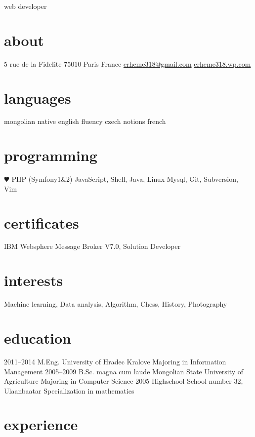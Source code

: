 \documentclass[backend=biber, print]{friggeri-cv}
\begin{document}
       {web developer}


\begin{aside}
  \section{about}
    5 rue de la Fidelite
    75010 Paris
    France
    \href{mailto:erheme318@gmail.com}{erheme318@gmail.com}
    \href{http://erheme318.wordpress.com}{erheme318.wp.com}
    \href{http://github.com/erheme318}{}
  \section{languages}
    mongolian native
    english fluency
    czech notions
    french
  \section{programming}
    {\color{red} $\varheartsuit$} PHP (Symfony1\&2)
    JavaScript, Shell, Java, Linux
    Mysql, Git, Subversion, Vim
  \section{certificates}
    IBM Websphere Message Broker V7.0, Solution Developer
\end{aside}

\section{interests}

Machine learning, Data analysis, Algorithm, Chess, History, Photography
\section{education}

\begin{entrylist}
  \entry
    {2011–2014}
    {M.Eng.}
    {University of Hradec Kralove}
    {Majoring in Information Management}
  \entry
    {2005–2009}
    {B.Sc. magna cum laude}
    {Mongolian State University of Agriculture}
    {Majoring in Computer Science}
  \entry
    {2005}
    {Highschool}
    {School number 32, Ulaanbaatar}
    {Specialization in mathematics}
\end{entrylist}

\section{experience}
\end{document}
